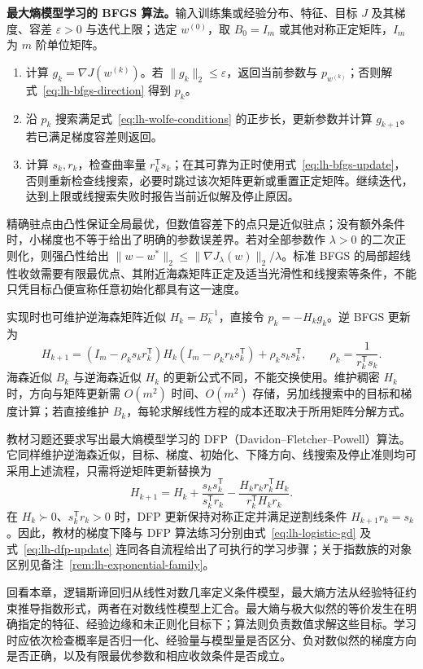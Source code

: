 \textbf{最大熵模型学习的 BFGS 算法。}输入训练集或经验分布、特征、目标 $J$ 及其梯度、容差 $\varepsilon>0$ 与迭代上限；选定 $w^{(0)}$，取 $B_0=I_m$ 或其他对称正定矩阵，$I_m$ 为 $m$ 阶单位矩阵。
\begin{enumerate}
\item 计算 $g_k=\nabla J(w^{(k)})$。若 $\|g_k\|_2\leq\varepsilon$，返回当前参数与 $p_{w^{(k)}}$；否则解式~\eqref{eq:lh-bfgs-direction} 得到 $p_k$。
\item 沿 $p_k$ 搜索满足式~\eqref{eq:lh-wolfe-conditions} 的正步长，更新参数并计算 $g_{k+1}$。若已满足梯度容差则返回。
\item 计算 $s_k,r_k$，检查曲率量 $r_k^{\mathsf T}s_k$；在其可靠为正时使用式~\eqref{eq:lh-bfgs-update}，否则重新检查线搜索，必要时跳过该次矩阵更新或重置正定矩阵。继续迭代，达到上限或线搜索失败时报告当前近似解及停止原因。
\end{enumerate}
精确驻点由凸性保证全局最优，但数值容差下的点只是近似驻点；没有额外条件时，小梯度也不等于给出了明确的参数误差界。若对全部参数作 $\lambda>0$ 的二次正则化，则强凸性给出 $\|w-w^*\|_2\leq\|\nabla J_\lambda(w)\|_2/\lambda$。标准 BFGS 的局部超线性收敛需要有限最优点、其附近海森矩阵正定及适当光滑性和线搜索等条件，不能只凭目标凸便宣称任意初始化都具有这一速度。

实现时也可维护逆海森矩阵近似 $H_k=B_k^{-1}$，直接令 $p_k=-H_kg_k$。逆 BFGS 更新为
\begin{equation}
H_{k+1}=(I_m-\rho_ks_kr_k^{\mathsf T})H_k
(I_m-\rho_kr_ks_k^{\mathsf T})+\rho_ks_ks_k^{\mathsf T},
\qquad\rho_k=\frac1{r_k^{\mathsf T}s_k}.
\label{eq:lh-inverse-bfgs}
\end{equation}
海森近似 $B_k$ 与逆海森近似 $H_k$ 的更新公式不同，不能交换使用。维护稠密 $H_k$ 时，方向与矩阵更新需 $O(m^2)$ 时间、$O(m^2)$ 存储，另加线搜索中的目标和梯度计算；若直接维护 $B_k$，每轮求解线性方程的成本还取决于所用矩阵分解方式。

教材习题还要求写出最大熵模型学习的 DFP（Davidon--Fletcher--Powell）算法。它同样维护逆海森近似，目标、梯度、初始化、下降方向、线搜索及停止准则均可采用上述流程，只需将逆矩阵更新替换为
\begin{equation}
H_{k+1}=H_k+\frac{s_ks_k^{\mathsf T}}{s_k^{\mathsf T}r_k}
-\frac{H_kr_kr_k^{\mathsf T}H_k}{r_k^{\mathsf T}H_kr_k}.
\label{eq:lh-dfp-update}
\end{equation}
在 $H_k\succ0$、$s_k^{\mathsf T}r_k>0$ 时，DFP 更新保持对称正定并满足逆割线条件 $H_{k+1}r_k=s_k$。因此，教材的梯度下降与 DFP 算法练习分别由式~\eqref{eq:lh-logistic-gd} 及式~\eqref{eq:lh-dfp-update} 连同各自流程给出了可执行的学习步骤；关于指数族的对象区别见备注~\ref{rem:lh-exponential-family}。

回看本章，逻辑斯谛回归从线性对数几率定义条件模型，最大熵方法从经验特征约束推导指数形式，两者在对数线性模型上汇合。最大熵与极大似然的等价发生在明确指定的特征、经验边缘和未正则化目标下；算法则负责数值求解这些目标。学习时应依次检查概率是否归一化、经验量与模型量是否区分、负对数似然的梯度方向是否正确，以及有限最优参数和相应收敛条件是否成立。








